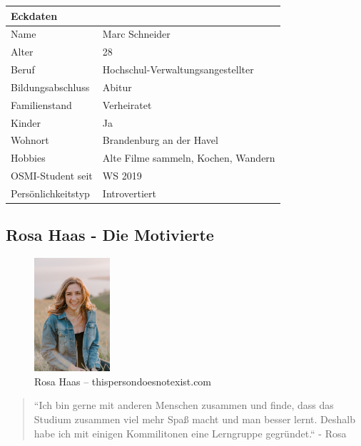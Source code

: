 \documentclass{article}
\begin{document}
\begin{center}
	\begin{tabularx}{\textwidth}{|l|X|}
		\hline
		\textbf{Eckdaten}  &                                     \\
		\hline
		Name               & Marc Schneider                      \\
		\hline
		Alter              & 28                                  \\
		\hline
		Beruf              & Hochschul-Verwaltungsangestellter   \\
		\hline
		Bildungsabschluss  & Abitur                              \\
		\hline
		Familienstand      & Verheiratet                         \\
		\hline
		Kinder             & Ja                                  \\
		\hline
		Wohnort            & Brandenburg an der Havel            \\
		\hline
		Hobbies            & Alte Filme sammeln, Kochen, Wandern \\
		\hline
		OSMI-Student seit  & WS 2019                             \\
		\hline
		Persönlichkeitstyp & Introvertiert                       \\
		\hline
	\end{tabularx}
\end{center}

\newpage

\subsection{Rosa Haas - Die Motivierte}

\begin{figure}[h]
	\includegraphics[width=0.25\textwidth]{rosa}
	\centering
	\caption{Rosa Haas – thispersondoesnotexist.com}
\end{figure}

\begin{quote}
	``Ich bin gerne mit anderen Menschen zusammen und finde, dass das Studium
	zusammen viel mehr Spaß macht und man besser lernt. Deshalb habe ich mit einigen
	Kommilitonen eine Lerngruppe gegründet.`` - Rosa
\end{quote}
\end{document}
